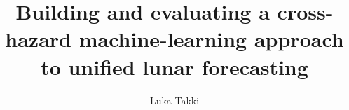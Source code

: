 \documentclass[3p,times,twocolumn,authoryear]{elsarticle}
\begin{document}
\begin{frontmatter}
\title{Building and evaluating a cross-hazard machine-learning approach to unified lunar forecasting}
\author[aff1]{Luka Takki}
\address[aff1]{European School of Luxembourg~I, 7 Rue Simone de Beauvoir, L-1283 Luxembourg, Luxembourg}
\begin{abstract}

\end{abstract}
\begin{keyword}

\end{keyword}
\end{frontmatter}

\end{document}

